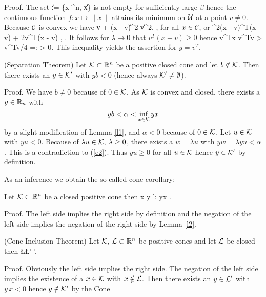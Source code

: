 %
%
Proof. The set
%
\beqn
\U := \{x \in {}^n, \; \|x\| \leq \beta \} \cap \C
\eeqn
%
is not empty for sufficiently large $\beta $ hence the continuous
function
$f: x \mapsto \|x\|$ attains its minimum on ${\cal U}$ at a point
$v \neq 0$. Because ${\cal C}$ is convex we have
\beqn
\|v + \lambda (x - v)\|^2 \geq \|v\|^2, \quad \lambda  \in [0,1],
\eeqn
for all $x \in {\cal C}$, or
\beqn
\lambda ^2(x - v)^T(x - v) + 2\lambda v^T(x - v) , \quad \lambda  \in
[0,1].
\eeqn
It follows for $\lambda \to 0$ that $v^T(x - v) \geq 0$ hence
\beqn
v^Tx \geq v^Tv > v^Tv/4 =: \alpha  > 0.
\eeqn
%
This inequality yields the assertion for $y = v^T$.
\par
%
\begin{lemma} \label{l2} (Separation Theorem)
Let ${\cal K} \subset \Bbb{R}^n$ be a positive closed cone and let
$b \notin {\cal K}$.  Then there exists an $y \in {\cal K}'$ with $y b <
0$ (hence always ${\cal K}' \neq \emptyset$).
\end{lemma}
%
%
Proof.  We have $b \neq 0$ because of $0 \in {\cal K}$.  As ${\cal K}$ is
convex and closed, there exists a $y \in \Bbb{R}_n$ with
%
\begin{equation} \label{e2}
yb < \alpha  < \inf_{x \in {\cal K}}yx
\end{equation}
%
by a slight modification of Lemma \ref{l1}, and $\alpha < 0$ because of $0 \in
{\cal K}$.  Let $u \in {\cal K}$ with $yu < 0$. Because of $\lambda u \in {\cal K}, \:  \lambda
\geq 0$, there exists a $w = \lambda u$ with $yw = \lambda yu < \alpha
$.  This is a contradiction to (\ref{e2}).  Thus $yu \geq 0$ for all $u \in
{\cal K}$ hence $y \in {\cal K}'$ by definition.
\par
%
%
As an inference we obtain the so-called cone corollary:
%
%
\begin{lemma} \label{l3} Let ${\cal K} \subset \Bbb{R}^n$ be a
closed positive cone then
%
\beqn
x \in \K \Longleftrightarrow \forall \; y \in \K': \; yx .
\eeqn
\end{lemma}
%
%
Proof. The left side implies the right side by definition and the negation of
the left side implies the negation of the right side by Lemma \ref{l2}.
%
%
\begin{lemma} \label{l4}
(Cone Inclusion Theorem) Let ${\cal K}, \: {\cal L} \subset
\Bbb{R}^n$ be positive cones and let ${\cal L}$ be closed then
\beqn
\K \subset \L \Longleftrightarrow \L' \subset \K'.
\eeqn
\end{lemma}
%
%
Proof.  Obviously the left side implies the right side.  The negation of the
left side implies the existence of a $x \in {\cal K}$ with $x \notin {\cal L}$.  Then there
exists an $y \in {\cal L}'$ with $y \, x < 0$ hence $y \notin {\cal K}'$ by the Cone
